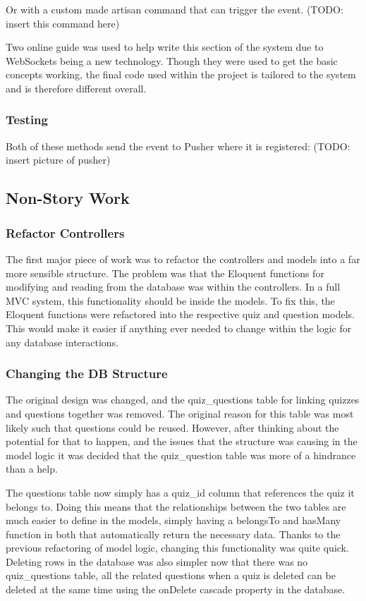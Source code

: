 Or with a custom made artisan command that can trigger the event. (TODO: insert this command here)

Two online guide was used to help write this section of the system due to WebSockets being a new technology\cite{pusher-guide}\cite{echo-guide}. Though they were used to get the basic concepts working, the final code used within the project is tailored to the system and is therefore different overall.
 
\subsubsection{Testing}
Both of these methods send the event to Pusher where it is registered: (TODO: insert picture of pusher)
\newpage

\subsection{Non-Story Work}
\subsubsection{Refactor Controllers}
The first major piece of work was to refactor the controllers and models into a far more sensible structure. The problem was that the Eloquent functions for modifying and reading from the database was within the controllers. In a full MVC system, this functionality should be inside the models. To fix this, the Eloquent functions were refactored into the respective quiz and question models. This would make it easier if anything ever needed to change within the logic for any database interactions.
\subsubsection{Changing the DB Structure}
The original design was changed, and the quiz\_questions table for linking quizzes and questions together was removed. The original reason for this table was most likely such that questions could be reused. However, after thinking about the potential for that to happen, and the issues that the structure was causing in the model logic it was decided that the quiz\_question table was more of a hindrance than a help.

The questions table now simply has a quiz\_id column that references the quiz it belongs to. Doing this means that the relationships between the two tables are much easier to define in the models, simply having a belongsTo and hasMany function in both that automatically return the necessary data. Thanks to the previous refactoring of model logic, changing this functionality was quite quick. Deleting rows in the database was also simpler now that there was no quiz\_questions table, all the related questions when a quiz is deleted can be deleted at the same time using the onDelete cascade property in the database.
